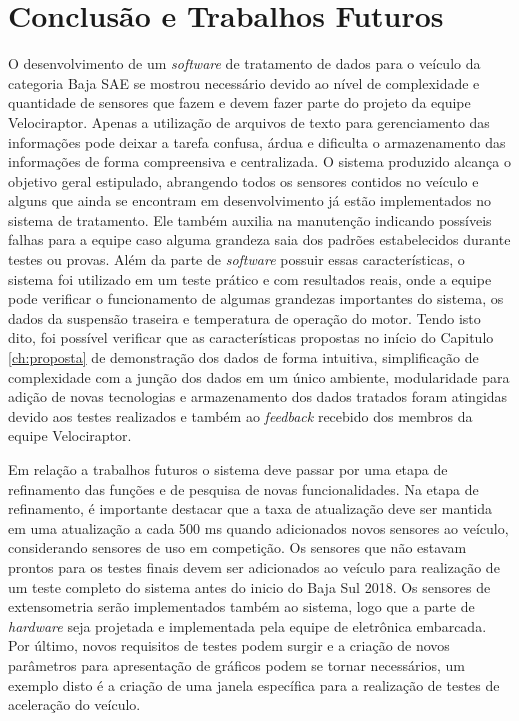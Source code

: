 \chapter{Conclusão e Trabalhos Futuros}
	\label{ch:consideracoes}
O desenvolvimento de um \textit{software} de tratamento de dados para o veículo da categoria Baja SAE se mostrou necessário devido ao nível de complexidade e quantidade de sensores que fazem e devem fazer parte do projeto da equipe Velociraptor. Apenas a utilização de arquivos de texto para gerenciamento das informações pode deixar a tarefa confusa, árdua e dificulta o armazenamento das informações de forma compreensiva e centralizada. O sistema produzido alcança o objetivo geral estipulado, abrangendo todos os sensores contidos no veículo e alguns que ainda se encontram em desenvolvimento já estão implementados no sistema de tratamento. Ele também auxilia na manutenção indicando possíveis falhas para a equipe caso alguma grandeza saia dos padrões estabelecidos durante testes ou provas. Além da parte de \textit{software} possuir essas características, o sistema foi utilizado em um teste prático e com resultados reais, onde a equipe pode verificar o funcionamento de algumas grandezas importantes do sistema, os dados da suspensão traseira e temperatura de operação do motor. Tendo isto dito, foi possível verificar que as características propostas no início do Capitulo \ref{ch:proposta} de demonstração dos dados de forma intuitiva, simplificação de complexidade com a junção dos dados em um único ambiente, modularidade para adição de novas tecnologias e armazenamento dos dados tratados foram atingidas devido aos testes realizados e também ao \textit{feedback} recebido dos membros da equipe Velociraptor.


Em relação a trabalhos futuros o sistema deve passar por uma etapa de refinamento das funções e de pesquisa de novas funcionalidades. Na etapa de refinamento, é importante destacar que a taxa de atualização deve ser mantida em uma atualização a cada 500 ms quando adicionados novos sensores ao veículo, considerando sensores de uso em competição. Os sensores que não estavam prontos para os testes finais devem ser adicionados ao veículo para realização de um teste completo do sistema antes do inicio do Baja Sul 2018. Os sensores de extensometria serão implementados também ao sistema, logo que a parte de \textit{hardware} seja projetada e implementada pela equipe de eletrônica embarcada. Por último, novos requisitos de testes podem surgir e a criação de novos parâmetros para apresentação de gráficos podem se tornar necessários, um exemplo disto é a criação de uma janela específica para a realização de testes de aceleração do veículo.

